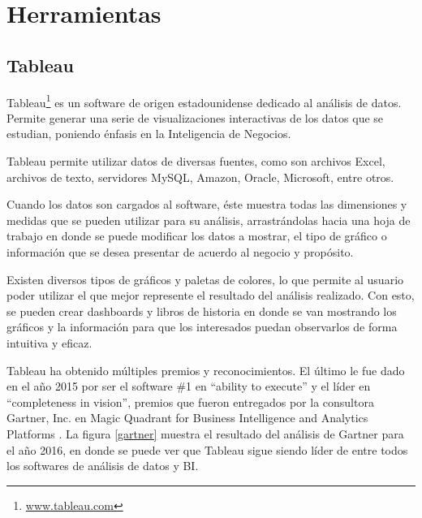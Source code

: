 \documentclass[letter,12pt,oneside]{report}
\begin{document}
\section{Herramientas}
\subsection{Tableau}
Tableau\footnote{\url{www.tableau.com}} es un software de origen estadounidense dedicado al análisis de datos. Permite generar una serie de visualizaciones interactivas de los datos que se estudian, poniendo énfasis en la Inteligencia de Negocios.

Tableau permite utilizar datos de diversas fuentes, como son archivos Excel, archivos de texto, servidores MySQL, Amazon, Oracle, Microsoft, entre otros.

Cuando los datos son cargados al software, éste muestra todas las dimensiones y medidas que se pueden utilizar para su análisis, arrastrándolas hacia una hoja de trabajo en donde se puede modificar los datos a mostrar, el tipo de gráfico o información que se desea presentar de acuerdo al negocio y propósito. 

Existen diversos tipos de gráficos y paletas de colores, lo que permite al usuario poder utilizar el que mejor represente el resultado del análisis realizado. Con esto, se pueden crear dashboards y libros de historia en donde se van mostrando los gráficos y la información para que los interesados puedan observarlos de forma intuitiva y eficaz.

Tableau ha obtenido múltiples premios y reconocimientos. El último le fue dado en el año 2015 por ser el software \#1 en “ability to execute” y el líder en “completeness in vision”, premios que fueron entregados por la consultora Gartner, Inc. en Magic Quadrant for Business Intelligence and Analytics Platforms \cite{magic}. La figura \ref{gartner} muestra el resultado del análisis de Gartner para el año 2016, en donde se puede ver que Tableau sigue siendo líder de entre todos los softwares de análisis de datos y BI.
\end{document}
